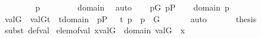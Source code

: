 \begin{isabellebody}
%
\isadelimproof
%
\endisadelimproof
%
\isatagproof
{}\isamarkupfalse%
\ {\isacharminus}{\kern0pt}\isanewline
\ \ \isamarkupfalse%
\isanewline
\ \ \ \ {\isachardoublequoteopen}{\isasymlangle}{\isasymtheta}{\isacharcomma}{\kern0pt}p{\isasymrangle}\ {\isasymin}\ {\isasympi}{\isachardoublequoteclose}\isanewline
\ \ \isamarkupfalse%
\isanewline
\ \ \isamarkupfalse%
\ {\isachardoublequoteopen}{\isasymtheta}{\isasymin}domain{\isacharparenleft}{\kern0pt}{\isasympi}{\isacharparenright}{\kern0pt}{\isachardoublequoteclose}\ \isamarkupfalse%
\ auto\isanewline
\ \ \isamarkupfalse%
\ {\isachardoublequoteopen}p{\isasymin}G{\isachardoublequoteclose}\ {\isachardoublequoteopen}p{\isasymin}P{\isachardoublequoteclose}\isanewline
\ \ \isamarkupfalse%
\ {\isacartoucheopen}{\isasymtheta}{\isasymin}domain{\isacharparenleft}{\kern0pt}{\isasympi}{\isacharparenright}{\kern0pt}{\isacartoucheclose}\ {\isacartoucheopen}{\isasymlangle}{\isasymtheta}{\isacharcomma}{\kern0pt}p{\isasymrangle}\ {\isasymin}\ {\isasympi}{\isacartoucheclose}\isanewline
\ \ \isamarkupfalse%
\ {\isachardoublequoteopen}val{\isacharparenleft}{\kern0pt}G{\isacharcomma}{\kern0pt}{\isasymtheta}{\isacharparenright}{\kern0pt}\ {\isasymin}\ {\isacharbraceleft}{\kern0pt}val{\isacharparenleft}{\kern0pt}G{\isacharcomma}{\kern0pt}t{\isacharparenright}{\kern0pt}\ {\isachardot}{\kern0pt}{\isachardot}{\kern0pt}\ t{\isasymin}domain{\isacharparenleft}{\kern0pt}{\isasympi}{\isacharparenright}{\kern0pt}\ {\isacharcomma}{\kern0pt}\ {\isasymexists}p{\isasymin}P\ {\isachardot}{\kern0pt}\ \ {\isasymlangle}t{\isacharcomma}{\kern0pt}\ p{\isasymrangle}{\isasymin}{\isasympi}\ {\isasymand}\ p\ {\isasymin}\ G\ {\isacharbraceright}{\kern0pt}{\isachardoublequoteclose}\isanewline
\ \ \ \ \isamarkupfalse%
\ auto\isanewline
\ \ \isamarkupfalse%
\isanewline
\ \ \isamarkupfalse%
\ {\isacharquery}{\kern0pt}thesis\ \isamarkupfalse%
\ {\isacharparenleft}{\kern0pt}subst\ def{\isacharunderscore}{\kern0pt}val{\isacharparenright}{\kern0pt}\isanewline
{}\isamarkupfalse%
%
\endisatagproof
{\isafoldproof}%
%
\isadelimproof
\isanewline
%
\endisadelimproof
\isanewline
{}\isamarkupfalse%
\ elem{\isacharunderscore}{\kern0pt}of{\isacharunderscore}{\kern0pt}val{\isacharcolon}{\kern0pt}\ {\isachardoublequoteopen}x{\isasymin}val{\isacharparenleft}{\kern0pt}G{\isacharcomma}{\kern0pt}{\isasympi}{\isacharparenright}{\kern0pt}\ {\isasymLongrightarrow}\ {\isasymexists}{\isasymtheta}{\isasymin}domain{\isacharparenleft}{\kern0pt}{\isasympi}{\isacharparenright}{\kern0pt}{\isachardot}{\kern0pt}\ val{\isacharparenleft}{\kern0pt}G{\isacharcomma}{\kern0pt}{\isasymtheta}{\isacharparenright}{\kern0pt}\ {\isacharequal}{\kern0pt}\ x{\isachardoublequoteclose}\isanewline

\end{isabellebody}
